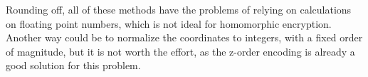 Rounding off, all of these methods have the problems of relying on calculations on floating point numbers, which is not ideal for homomorphic encryption. Another way could be to normalize the coordinates to integers, with a fixed order of magnitude, but it is not worth the effort, as the z-order encoding is already a good solution for this problem.

